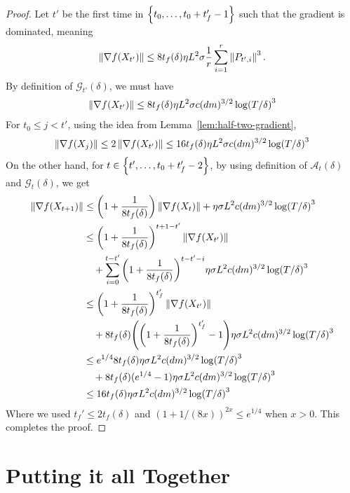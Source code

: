 \begin{proof}
    Let $t'$ be the first time in $\left\{t_0, \ldots, t_0+t_f'-1\right\}$ such that the gradient is dominated, meaning
    \begin{align*}
        \left\lVert \nabla f(X_{t'}) \right\rVert \leq 8t_f(\delta) \eta L^2 \sigma \frac{1}{r} \sum_{i=1}^r \left\lVert P_{t',i} \right\rVert^3.
    \end{align*}
    By definition of $\mathcal G_{t'}(\delta)$, we must have
    \begin{align*}
        \left\lVert \nabla f(X_{t'}) \right\rVert \leq 8t_f(\delta) \eta L^2 \sigma c(dm)^{3/2} \log(T/\delta)^3
    \end{align*}
    For $t_0\leq j<t'$, using the idea from Lemma~\ref{lem:half-two-gradient},
    \begin{align*}
        \left\lVert \nabla f(X_j) \right\rVert \leq 2 \left\lVert \nabla f(X_{t'}) \right\rVert \leq 16 t_f(\delta)\eta L^2 \sigma c(dm)^{3/2} \log(T/\delta)^3
    \end{align*}
    On the other hand, for $t \in \left\{t', \ldots, t_0+t_f'-2\right\}$, by using definition of $\mathcal A_t(\delta)$ and $\mathcal G_t(\delta)$, we get
    \begin{align*}
        \left\lVert \nabla f(X_{t+1}) \right\rVert &\leq \qty(1 + \frac{1}{8t_f(\delta)})\left\lVert \nabla f(X_t) \right\rVert + \eta \sigma L^2 c(dm)^{3/2} \log(T/\delta)^3
        \\&\leq \qty(1+\frac{1}{8t_f(\delta)})^{t+1-t'} \left\lVert \nabla f(X_{t'}) \right\rVert 
        \\&\quad + \sum_{i=0}^{t-t'} \qty(1+\frac{1}{8t_f(\delta)})^{t-t'-i} \eta \sigma L^2 c(dm)^{3/2} \log(T/\delta)^3 \\
        &\leq \qty(1+\frac{1}{8t_f(\delta)})^{t_f'} \left\lVert \nabla f(X_{t'}) \right\rVert
        \\&\quad + 8t_f(\delta) \qty(\qty(1+\frac{1}{8t_f(\delta)})^{t_f'} - 1) \eta \sigma L^2 c(dm)^{3/2} \log(T/\delta)^3 \\
        &\leq e^{1/4} 8t_f(\delta) \eta \sigma L^2 c(dm)^{3/2} \log(T/\delta)^3 
        \\&\quad+ 8t_f(\delta)(e^{1/4} - 1) \eta \sigma L^2 c(dm)^{3/2} \log(T/\delta)^3
        \\&\leq 16 t_f(\delta) \eta \sigma L^2 c(dm)^{3/2} \log(T/\delta)^3
    \end{align*}
    Where we used $t_f' \leq 2t_f(\delta)$ and $(1+1/(8x))^{2x} \leq e^{1/4}$ when $x > 0$. This completes the proof. 
\end{proof}

\section{Putting it all Together}

